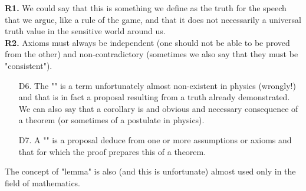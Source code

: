 	\begin{tcolorbox}[title=Remarks,colframe=black,arc=10pt]
	\textbf{R1.} We could say that this is something we define as the truth for the speech that we argue, like a rule of the game, and that it does not necessarily a universal truth value in the sensitive world around us.\\

	\textbf{R2.} Axioms must always be independent (one should not be able to be proved from the other) and non-contradictory (sometimes we also say that they must be "consistent"). 
	\end{tcolorbox}	
	
\begin{itemize}
	\item[D6.] The "" is a term unfortunately almost non-existent in physics (wrongly!) and that is in fact a proposal resulting from a truth already demonstrated. We can also say that a corollary is and obvious and necessary consequence of a theorem (or sometimes of a postulate in physics). 

	\item[D7.] A "" is a proposal deduce from one or more assumptions or axioms and that for which the proof prepares this of a theorem.
\end{itemize}

	\begin{tcolorbox}[title=Remark,colframe=black,arc=10pt]
The concept of "lemma" is also (and this is unfortunate) almost used only in the field of mathematics. 
	\end{tcolorbox}	


